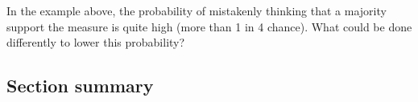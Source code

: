 \begin{exercisewrap}
\begin{nexercise}
In the example above, the probability of mistakenly thinking that a majority support the measure is quite high (more than 1 in 4 chance).  What could be done differently to lower this probability?\footnotemark
\end{nexercise}
\end{exercisewrap}



\D{\newpage}

\subsection*{Section summary}


